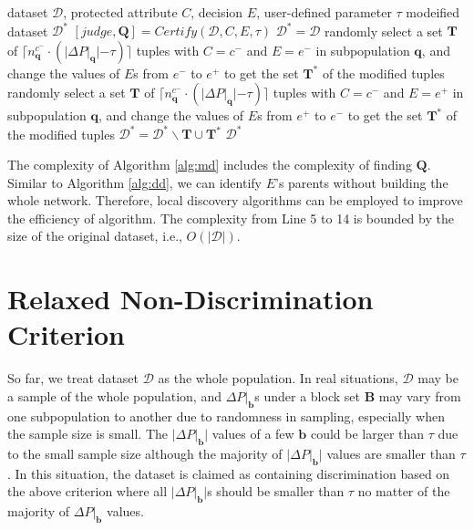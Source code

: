 \documentclass[twoside,leqno,twocolumn]{article}
\begin{document}
\begin{algorithm}[htb]\small
\caption{Removal by Modifying Data (MData)}
\label{alg:md}
\begin{algorithmic}[1]
\REQUIRE dataset $\mathcal{D}$, protected attribute $C$, decision $E$, user-defined parameter $\tau$
\ENSURE modeified dataset $\mathcal{D}^{*}$
		\STATE $[judge,\mathbf{Q}]=Certify(\mathcal{D},C,E,\tau)$
			\STATE $\mathcal{D}^{*}=\mathcal{D}$
		\ELSE
					\STATE randomly select a set $\mathbf{T}$ of $\lceil n_{\mathbf{q}}^{c^{-}}\cdot (|\Delta P|_{\mathbf{q}}|-\tau) \rceil$ tuples with $C=c^{-}$ and $E=e^{-}$ in subpopulation $\mathbf{q}$, and change the values of $E$s from $e^{-}$ to $e^{+}$ to get the set $\mathbf{T}^{*}$ of the modified tuples
					\STATE randomly select a set $\mathbf{T}$ of $\lceil n_{\mathbf{q}}^{c^{-}}\cdot (|\Delta P|_{\mathbf{q}}|-\tau) \rceil$ tuples with $C=c^{-}$ and $E=e^{+}$ in subpopulation $\mathbf{q}$, and change the values of $E$s from $e^{+}$ to $e^{-}$ to get the set $\mathbf{T}^{*}$ of the modified tuples
				\ENDIF
				\STATE $\mathcal{D}^{*}=\mathcal{D}^{*}\backslash \mathbf{T}\cup \mathbf{T}^{*}$
			\ENDFOR
		\ENDIF
		\RETURN $\mathcal{D}^{*}$
\end{algorithmic}
\end{algorithm}

The complexity of Algorithm \ref{alg:md} includes the complexity of finding $\mathbf{Q}$. Similar to Algorithm \ref{alg:dd}, we can identify $E$'s parents without building the whole network. Therefore, local discovery algorithms can be employed to improve the efficiency of algorithm. The complexity from Line 5 to 14 is bounded by the size of the original dataset, i.e., $O(|\mathcal{D}|)$.


\section{Relaxed Non-Discrimination Criterion}\label{sec:rnc}
So far, we treat dataset $\mathcal{D}$ as the whole population. In real situations, $\mathcal{D}$ may be a sample of the whole population, and $\Delta P|_{\mathbf{b}}$s under a block set $\mathbf{B}$ may vary from one subpopulation to another due to randomness in sampling, especially when the sample size is small. The $|\Delta P|_{\mathbf{b}}|$ values of a few $\mathbf{b}$ could be larger than $\tau$ due to the small sample size although the majority of $|\Delta P|_{\mathbf{b}}|$ values are smaller than $\tau$. In this situation, the dataset is claimed as containing discrimination based on the above criterion where all $|\Delta P|_{\mathbf{b}}|$s should be smaller than $\tau$ no matter of the majority of $\Delta P|_{\mathbf{b}}$ values.
\end{document}
